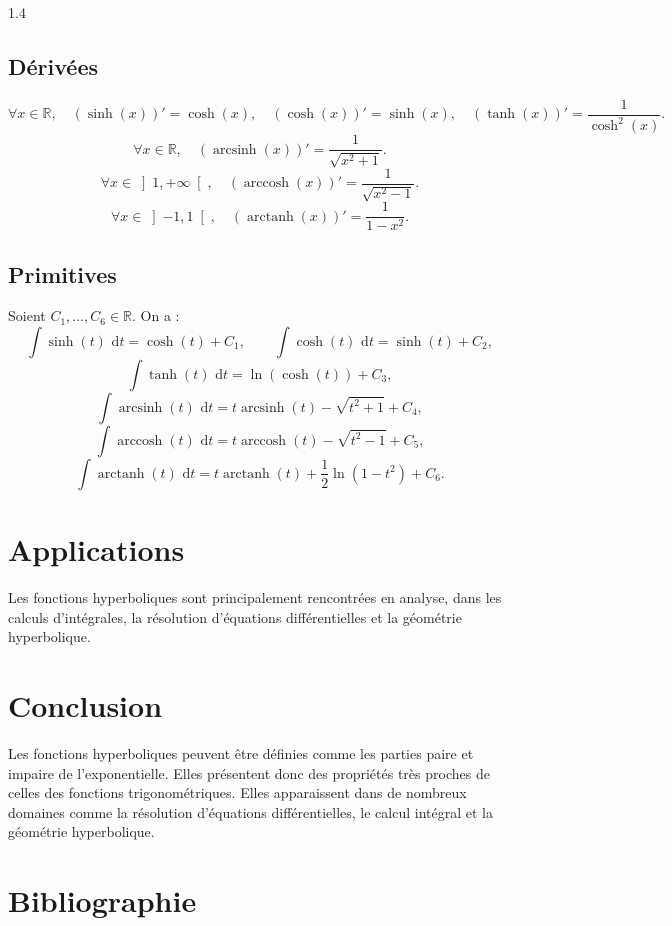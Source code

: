 \documentclass{article}
\DeclareMathOperator{\arccosh}{arccosh}
\DeclareMathOperator{\arcsinh}{arcsinh}
\DeclareMathOperator{\arctanh}{arctanh}
\newcommand{\dd}{\,\mathrm{d}}
\begin{document}
\begin{spacing}{1.4}
\subsection{Dérivées}
\begin{tcolorbox}[colframe=blue!75!black,colback=blue!5!white,title=Dérivées des fonctions hyperboliques]
\[
\forall x \in \mathbb{R},\quad
(\sinh(x))' = \cosh(x),\quad
(\cosh(x))' = \sinh(x),\quad
(\tanh(x))' = \frac{1}{\cosh^2(x)}.
\]
\[
\forall x \in \mathbb{R},\quad
(\arcsinh(x))' = \frac{1}{\sqrt{x^2+1}}.
\]
\[
\forall x \in \left]1,+\infty\right[,\quad
(\arccosh(x))' = \frac{1}{\sqrt{x^2-1}}.
\]
\[
\forall x \in \left]-1,1\right[,\quad
(\arctanh(x))' = \frac{1}{1-x^2}.
\]
\end{tcolorbox}

\subsection{Primitives}
\begin{tcolorbox}[colframe=blue!75!black,colback=blue!5!white,title=Primitives des fonctions hyperboliques]
Soient $C_1,\dots,C_6\in\mathbb{R}$. On a :
\[
\int \sinh(t)\,\dd t=\cosh(t)+C_1,
\qquad
\int \cosh(t)\,\dd t=\sinh(t)+C_2,
\]
\[
\int \tanh(t)\,\dd t=\ln(\cosh(t))+C_3,
\]
\[
\int \arcsinh(t)\,\dd t=t\arcsinh(t)-\sqrt{t^2+1}+C_4,
\]
\[
\int \arccosh(t)\,\dd t=t\arccosh(t)-\sqrt{t^2-1}+C_5,
\]
\[
\int \arctanh(t)\,\dd t=t\arctanh(t)+\frac12\ln(1-t^2)+C_6.
\]
\end{tcolorbox}

\end{spacing}

\section{Applications}
Les fonctions hyperboliques sont principalement rencontrées en analyse, dans les calculs d'intégrales, la résolution d'équations différentielles et la géométrie hyperbolique.

\section{Conclusion}
Les fonctions hyperboliques peuvent être définies comme les parties paire et impaire de l'exponentielle. Elles présentent donc des propriétés très proches de celles des fonctions trigonométriques. Elles apparaissent dans de nombreux domaines comme la résolution d'équations différentielles, le calcul intégral et la géométrie hyperbolique.

\section{Bibliographie}
\printbibliography
\end{document}
